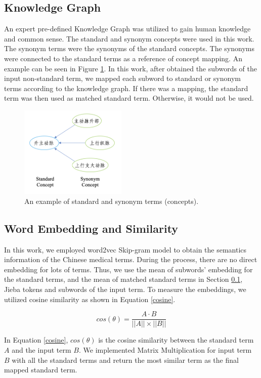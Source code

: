 \documentclass{article}
\newcommand{\reffig}[1]{Figure \ref{#1}}
\newcommand{\refsec}[1]{Section \ref{#1}}
\newcommand{\refequ}[1]{Equation \ref{#1}}
\begin{document}
\subsection{Knowledge Graph}\label{Knowledge-Graph}
An expert pre-defined Knowledge Graph was utilized to gain human knowledge and common sense. The standard and synonym concepts were used in this work. The synonym terms were the synonyms of the standard concepts. The synonyms were connected to the standard terms as a reference of concept mapping. An example can be seen in \reffig{Standard-Synonym-Terms}. In this work, after obtained the subwords of the input non-standard term, we mapped each subword to standard or synonym terms according to the knowledge graph. If there was a mapping, the standard term was then used as matched standard term. Otherwise, it would not be used.

\begin{figure}[h]
	\centering
	\includegraphics[width=2in]{Standard-Synonym-Terms.png}
	\caption{An example of standard and synonym terms (concepts).}
	\label{Standard-Synonym-Terms}
\end{figure}

\subsection{Word Embedding and Similarity}
In this work, we employed word2vec Skip-gram model\cite{mikolov2013efficient} to obtain the semantics information of the Chinese medical terms. During the process, there are no direct embedding for lots of terms. Thus, we use the mean of subwords' embedding for the standard terms, and the mean of matched standard terms in \refsec{Knowledge-Graph}, Jieba tokens and subwords of the input term. To measure the embeddings, we utilized cosine similarity as shown in \refequ{cosine}.

\begin{equation}\label{cosine}
	cos(\theta)=\frac{A\cdot B}{||A||\times||B||}
\end{equation}

In \refequ{cosine}, $cos(\theta)$ is the cosine similarity between the standard term $A$ and the input term $B$. We implemented Matrix Multiplication for input term $B$ with all the standard terms and return the most similar term as the final mapped standard term.
\end{document}
